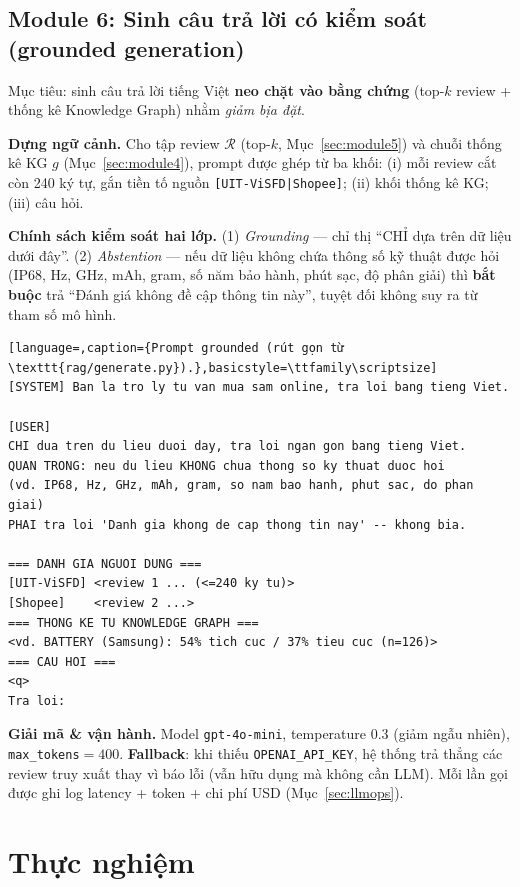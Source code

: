\documentclass[12pt,a4paper]{article}
\begin{document}
\subsection{Module 6: Sinh câu trả lời có kiểm soát (grounded generation)}
\label{sec:module6}

Mục tiêu: sinh câu trả lời tiếng Việt \textbf{neo chặt vào bằng chứng} (top-$k$ review + thống kê Knowledge Graph) nhằm \textit{giảm bịa đặt}.

\textbf{Dựng ngữ cảnh.} Cho tập review $\mathcal{R}$ (top-$k$, Mục~\ref{sec:module5}) và chuỗi thống kê KG $g$ (Mục~\ref{sec:module4}), prompt được ghép từ ba khối: (i) mỗi review cắt còn 240 ký tự, gắn tiền tố nguồn \texttt{[UIT-ViSFD|Shopee]}; (ii) khối thống kê KG; (iii) câu hỏi.

\textbf{Chính sách kiểm soát hai lớp.} (1) \textit{Grounding} --- chỉ thị ``CHỈ dựa trên dữ liệu dưới đây''. (2) \textit{Abstention} --- nếu dữ liệu không chứa thông số kỹ thuật được hỏi (IP68, Hz, GHz, mAh, gram, số năm bảo hành, phút sạc, độ phân giải) thì \textbf{bắt buộc} trả ``Đánh giá không đề cập thông tin này'', tuyệt đối không suy ra từ tham số mô hình.

\begin{lstlisting}[language=,caption={Prompt grounded (rút gọn từ \texttt{rag/generate.py}).},basicstyle=\ttfamily\scriptsize]
[SYSTEM] Ban la tro ly tu van mua sam online, tra loi bang tieng Viet.

[USER]
CHI dua tren du lieu duoi day, tra loi ngan gon bang tieng Viet.
QUAN TRONG: neu du lieu KHONG chua thong so ky thuat duoc hoi
(vd. IP68, Hz, GHz, mAh, gram, so nam bao hanh, phut sac, do phan giai)
PHAI tra loi 'Danh gia khong de cap thong tin nay' -- khong bia.

=== DANH GIA NGUOI DUNG ===
[UIT-ViSFD] <review 1 ... (<=240 ky tu)>
[Shopee]    <review 2 ...>
=== THONG KE TU KNOWLEDGE GRAPH ===
<vd. BATTERY (Samsung): 54% tich cuc / 37% tieu cuc (n=126)>
=== CAU HOI ===
<q>
Tra loi:
\end{lstlisting}

\textbf{Giải mã \& vận hành.} Model \texttt{gpt-4o-mini}, temperature $0.3$ (giảm ngẫu nhiên), \texttt{max\_tokens}$=400$. \textbf{Fallback}: khi thiếu \texttt{OPENAI\_API\_KEY}, hệ thống trả thẳng các review truy xuất thay vì báo lỗi (vẫn hữu dụng mà không cần LLM). Mỗi lần gọi được ghi log latency + token + chi phí USD (Mục~\ref{sec:llmops}).

\section{Thực nghiệm}
\end{document}
